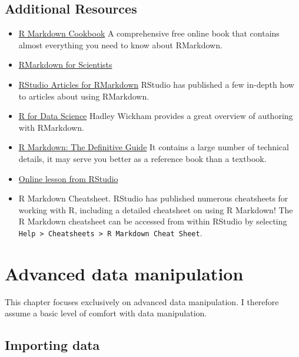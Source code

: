 \documentclass[
]{book}
\providecommand{\tightlist}{%
  \setlength{\itemsep}{0pt}\setlength{\parskip}{0pt}}
\begin{document}
\hypertarget{additional-resources}{%
\section{Additional Resources}\label{additional-resources}}

\begin{itemize}
\tightlist
\item
  \href{https://bookdown.org/yihui/rmarkdown-cookbook/}{R Markdown Cookbook}
  A comprehensive free online book that contains almost everything you need to know about RMarkdown.
\item
  \href{https://rmd4sci.njtierney.com/}{RMarkdown for Scientists}
\item
  \href{https://support.rstudio.com/hc/en-us/sections/200149716-R-Markdown}{RStudio Articles for RMarkdown}
  RStudio has published a few in-depth how to articles about using RMarkdown.
\item
  \href{https://r4ds.had.co.nz/index.html}{R for Data Science}
  Hadley Wickham provides a great overview of authoring with RMarkdown.
\item
  \href{https://bookdown.org/yihui/rmarkdown/}{R Markdown: The Definitive Guide}
  It contains a large number of technical details, it may serve you better as a reference book than a textbook.
\item
  \href{https://rmarkdown.rstudio.com/lesson-1.html}{Online lesson from RStudio}
\item
  R Markdown Cheatsheet. RStudio has published numerous cheatsheets for working with R, including a detailed cheatsheet on using R Markdown! The R Markdown cheatsheet can be accessed from within RStudio by selecting \texttt{Help\ \textgreater{}\ Cheatsheets\ \textgreater{}\ R\ Markdown\ Cheat\ Sheet}.
\end{itemize}

\hypertarget{advanced-data-manipulation}{%
\chapter{Advanced data manipulation}\label{advanced-data-manipulation}}

This chapter focuses exclusively on advanced data manipulation. I therefore assume a basic level of comfort with data manipulation.

\hypertarget{importing-data}{%
\section{Importing data}\label{importing-data}}
\end{document}
